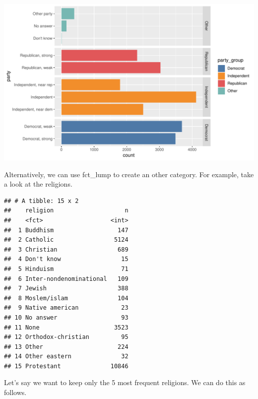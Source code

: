 \documentclass[]{tufte-book}
\newenvironment{Shaded}{}{}
\newcommand{\KeywordTok}[1]{\textcolor[rgb]{0.00,0.44,0.13}{\textbf{#1}}}
\newcommand{\DataTypeTok}[1]{\textcolor[rgb]{0.56,0.13,0.00}{#1}}
\newcommand{\DecValTok}[1]{\textcolor[rgb]{0.25,0.63,0.44}{#1}}
\newcommand{\StringTok}[1]{\textcolor[rgb]{0.25,0.44,0.63}{#1}}
\newcommand{\OperatorTok}[1]{\textcolor[rgb]{0.40,0.40,0.40}{#1}}
\newcommand{\NormalTok}[1]{#1}
\begin{document}
\includegraphics{cleaning_tutorial_files/figure-latex/unnamed-chunk-75-1}

Alternatively, we can use fct\_lump to create an other category. For
example, take a look at the religions.

\begin{Shaded}
\end{Shaded}

\begin{verbatim}
## # A tibble: 15 x 2
##    religion                    n
##    <fct>                   <int>
##  1 Buddhism                  147
##  2 Catholic                 5124
##  3 Christian                 689
##  4 Don't know                 15
##  5 Hinduism                   71
##  6 Inter-nondenominational   109
##  7 Jewish                    388
##  8 Moslem/islam              104
##  9 Native american            23
## 10 No answer                  93
## 11 None                     3523
## 12 Orthodox-christian         95
## 13 Other                     224
## 14 Other eastern              32
## 15 Protestant              10846
\end{verbatim}

Let's say we want to keep only the 5 most frequent religions. We can do
this as follows.

\begin{Shaded}
\end{Shaded}
\end{document}
